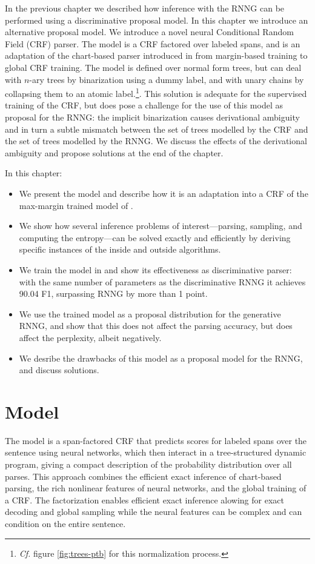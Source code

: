 In the previous chapter we described how inference with the RNNG can be performed using a discriminative proposal model. In this chapter we introduce an alternative proposal model. We introduce a novel neural Conditional Random Field (CRF) parser. The model is a CRF factored over labeled spans, and is an adaptation of the chart-based parser introduced in \citet{stern2017minimal} from margin-based training to global CRF training. The model is defined over normal form trees, but can deal with $n$-ary trees by binarization using a dummy label, and with unary chains by collapsing them to an atomic label.\footnote{\textit{Cf.} figure \ref{fig:trees-ptb} for this normalization process.}. This solution is adequate for the supervised training of the CRF, but does pose a challenge for the use of this model as proposal for the RNNG: the implicit binarization causes derivational ambiguity and in turn a subtle mismatch between the set of trees modelled by the CRF and the set of trees modelled by the RNNG. We discuss the effects of the derivational ambiguity and propose solutions at the end of the chapter.

In this chapter:
\begin{itemize}
  \item We present the model and describe how it is an adaptation into a CRF of the max-margin trained model of \citet{stern2017minimal}.
  \item We show how several inference problems of interest---parsing, sampling, and computing the entropy---can be solved exactly and efficiently by deriving specific instances of the inside and outside algorithms.
  \item We train the model in and show its effectiveness as discriminative parser: with the same number of parameters as the discriminative RNNG it achieves 90.04 F1, surpassing RNNG by more than 1 point.
  \item We use the trained model as a proposal distribution for the generative RNNG, and show that this does not affect the parsing accuracy, but does affect the perplexity, albeit negatively.
  \item We desribe the drawbacks of this model as a proposal model for the RNNG, and discuss solutions.
\end{itemize}

\section{Model}
   The model is a span-factored CRF that predicts scores for labeled spans over the sentence using neural networks, which then interact in a tree-structured dynamic program, giving a compact description of the probability distribution over all parses. This approach combines the efficient exact inference of chart-based parsing, the rich nonlinear features of neural networks, and the global training of a CRF. The factorization enables efficient exact inference alowing for exact decoding and global sampling while the neural features can be complex and can condition on the entire sentence.

